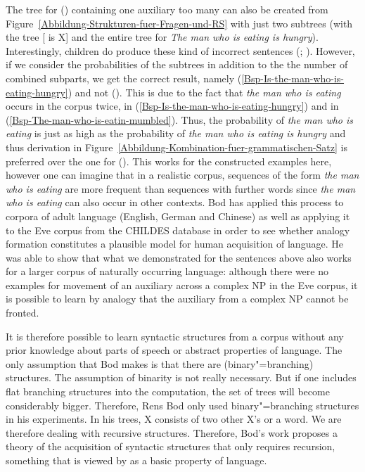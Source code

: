 The tree for () containing one auxiliary too many can also be created from Figure~\ref{Abbildung-Strukturen-fuer-Fragen-und-RS} with just two subtrees 
(with the tree [ is X] and the entire tree for \emph{The man who is eating is hungry}).
\z
Interestingly, children do produce these kind of incorrect sentences (\citealp[]{CN87a-u}; \citealp*{ARP2008a}). 
However, if we consider the probabilities of the subtrees in addition to the the number of combined
subparts, we get the correct result, namely (\ref{Bsp-Is-the-man-who-is-eating-hungry}) and not ().
This is due to the fact that \emph{the man who is eating} occurs in the corpus twice, in (\ref{Bsp-Is-the-man-who-is-eating-hungry}) and in
(\ref{Bsp-The-man-who-is-eatin-mumbled}).
Thus, the probability of \emph{the man who
  is eating} is just as high as the probability of \emph{the man who is eating is hungry} and thus derivation in Figure~\ref{Abbildung-Kombination-fuer-grammatischen-Satz} 
  is preferred over the one for ().
This works for the constructed examples here, however one can imagine that in a realistic corpus, sequences of the form \emph{the man who is eating} are more frequent
than sequences with further words since \emph{the man who is eating} can also occur in other contexts.
Bod has applied this process to corpora of adult language (English, German and Chinese) as well as
applying it to the Eve corpus from the CHILDES database in order to see whether analogy formation constitutes a plausible model
for human acquisition of language. He was able to show that what we demonstrated for
the sentences above also works for a larger corpus of
naturally occurring language: although there were no examples for movement of an auxiliary across a complex NP in the Eve corpus, it is possible to learn
by analogy that the auxiliary from a complex NP cannot be fronted.

It is therefore possible to learn syntactic structures from a corpus without any prior knowledge
about parts of speech or abstract properties of language.
The only assumption that Bod makes is that there are (binary"=branching) structures. The assumption of binarity is not really
necessary. But if one includes flat branching structures into the computation, the set of trees will
become considerably bigger. Therefore, Rens Bod only used binary"=branching structures in his
experiments. In his trees, X consists of two other X's or a word. We are therefore dealing with
recursive structures. Therefore, Bod's work proposes a theory of the acquisition of
syntactic structures that only requires recursion, something that is viewed by \citet*{HCF2002a} as a basic property of language.

